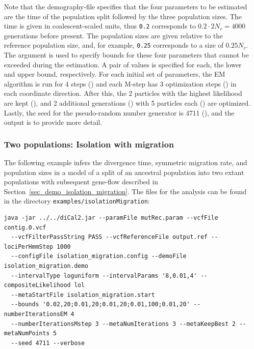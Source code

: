 \documentclass{article}
\numberwithin{equation}{section}
\begin{document}
Note that the demography-file specifies that the four parameters to be estimated are the time of the population split followed by the three population sizes. The time is given in coalescent-scaled units, thus \texttt{0.2} corresponds to $0.2 \cdot 2 N_r = 4000$ generations before present. The population sizes are given relative to the reference population size, and, for example, \texttt{0.25} corresponds to a size of $0.25 N_r$. The argument  is used to specify bounds for these four parameters that cannot be exceeded during the estimation. A pair of values is specified for each, the lower and upper bound, respectively. For each initial set of parameters, the EM algorithm is run for 4 steps () and each M-step has 3 optimization steps () in each coordinate direction. After this, the 2 particles with the highest likelihood are kept (), and 2 additional generations () with 5 particles each () are optimized. Lastly, the seed for the pseudo-random number generator is 4711 (), and the output is  to provide more detail.

\subsubsection{Two populations: Isolation with migration}

The following example infers the divergence time, symmetric migration rate, and population sizes in a model of a split of an ancestral population into two extant populations with subsequent gene-flow described in Section~\ref{sec_demo_isolation_migration}. The files for the analysis can be found in the directory \texttt{examples/isolationMigration}:

\begin{verbatim}
java -jar ../../diCal2.jar --paramFile mutRec.param --vcfFile contig.0.vcf
  --vcfFilterPassString PASS --vcfReferenceFile output.ref --lociPerHmmStep 1000
  --configFile isolation_migration.config --demoFile isolation_migration.demo
  --intervalType loguniform --intervalParams '8,0.01,4' --compositeLikelihood lol
  --metaStartFile isolation_migration.start
  --bounds '0.02,20;0.01,20;0.01,20;0.01,100;0.01,20' --numberIterationsEM 4
  --numberIterationsMstep 3 --metaNumIterations 3 --metaKeepBest 2 --metaNumPoints 5
  --seed 4711 --verbose
\end{verbatim}
\end{document}
